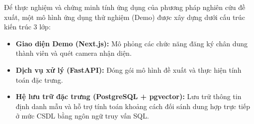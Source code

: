 Để thực nghiệm và chứng minh tính ứng dụng của phương pháp nghiên cứu đề xuất, một mô hình ứng dụng thử nghiệm (Demo) được xây dựng dưới cấu trúc kiến trúc 3 lớp:
\begin{itemize}
    \item \textbf{Giao diện Demo (Next.js):} Mô phỏng các chức năng đăng ký chân dung thành viên và quét camera nhận diện.
    \item \textbf{Dịch vụ xử lý (FastAPI):} Đóng gói mô hình đề xuất và thực hiện tính toán đặc trưng.
    \item \textbf{Hệ lưu trữ đặc trưng (PostgreSQL + pgvector):} Lưu trữ thông tin định danh mẫu và hỗ trợ tính toán khoảng cách đối sánh dung hợp trực tiếp ở mức CSDL bằng ngôn ngữ truy vấn SQL.
\end{itemize}
